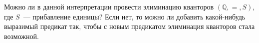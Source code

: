 Можно ли в данной интерпретации провести элиминацию кванторов $(\mathbb{Q}, =, S)$, где $S$~---
прибавление единицы? Если нет, то можно ли добавить какой-нибудь выразимый предикат так, чтобы с новым
предикатом элиминация кванторов стала возможной.
